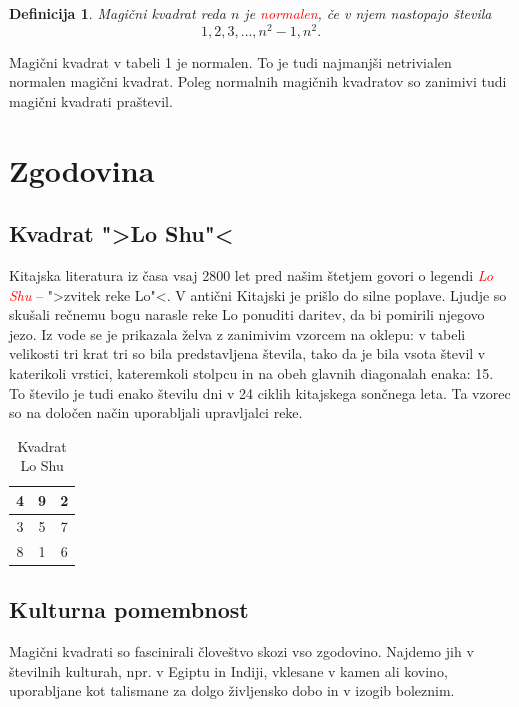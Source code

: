 \documentclass[a4paper,12pt]{article}
\newtheorem{definicija}[izrek]{Definicija}
\begin{document}
\begin{definicija}
   Magični kvadrat reda $n$ je \textcolor{red}{\emph{normalen}}, če v njem nastopajo števila
   \begin{equation}
      1, 2, 3, \ldots, n^2-1, n^2.
   \end{equation}
\end{definicija}

Magični kvadrat v tabeli 1 je normalen.
To je tudi najmanjši netrivialen normalen magični kvadrat.
Poleg normalnih magičnih kvadratov so zanimivi tudi magični kvadrati praštevil.

\section{Zgodovina}

\subsection{Kvadrat ">Lo Shu"<}

Kitajska literatura iz časa vsaj 2800 let pred našim štetjem govori o legendi
\textcolor{red}{\emph{Lo Shu}} -- ">zvitek reke Lo"<. V antični Kitajski je prišlo do
silne poplave. Ljudje so skušali rečnemu bogu narasle reke Lo ponuditi daritev,
da bi pomirili njegovo jezo. Iz vode se je prikazala želva z zanimivim vzorcem
na oklepu: v tabeli velikosti tri krat tri so bila predstavljena števila, tako
da je bila vsota števil v katerikoli vrstici, kateremkoli stolpcu in na obeh
glavnih diagonalah enaka: 15. To število je tudi enako številu dni v 24 ciklih
kitajskega sončnega leta. Ta vzorec so na določen način uporabljali upravljalci
reke.

\begin{table}[h]
   \centering
   \large
   \caption{Kvadrat Lo Shu}
   \begin{tabular}{|c|c|c|}
      \hline
         4 & 9 & 2 \\\hline
         3 & 5 & 7 \\\hline
         8 & 1 & 6 \\\hline
   \end{tabular}
   \label{table:loshu}
\end{table}

\subsection{Kulturna pomembnost}

Magični kvadrati so fascinirali človeštvo skozi vso zgodovino. Najdemo jih
v številnih kulturah, npr. v Egiptu in Indiji, vklesane v kamen ali
kovino, uporabljane kot talismane za dolgo življensko dobo in v
izogib boleznim.
\end{document}

